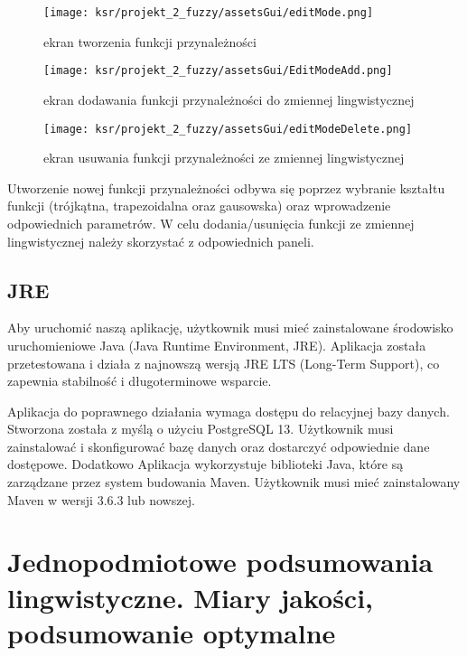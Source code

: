 \documentclass{article}
\begin{document}
\begin{figure}[H]
  \begin{minipage}[b]{0.3\linewidth}
    \centering
    \texttt{[image: ksr/projekt\_2\_fuzzy/assetsGui/editMode.png]}
    \caption{ekran tworzenia funkcji przynależności}
  \end{minipage}
  \hfill
  \begin{minipage}[b]{0.3\linewidth}
    \centering
    \texttt{[image: ksr/projekt\_2\_fuzzy/assetsGui/EditModeAdd.png]}
    \caption{ekran dodawania funkcji przynależności do zmiennej lingwistycznej}
  \end{minipage}
  \hfill
  \begin{minipage}[b]{0.3\linewidth}
    \centering
    \texttt{[image: ksr/projekt\_2\_fuzzy/assetsGui/editModeDelete.png]}
    \caption{ekran usuwania funkcji przynależności ze zmiennej lingwistycznej}
  \end{minipage}
\end{figure}

\noindent Utworzenie nowej funkcji przynależności odbywa się poprzez wybranie kształtu funkcji (trójkątna, trapezoidalna oraz gausowska) oraz wprowadzenie odpowiednich parametrów. W celu dodania/usunięcia funkcji ze zmiennej lingwistycznej należy skorzystać z odpowiednich paneli.


\subsection{JRE}

\noindent Aby uruchomić naszą aplikację, użytkownik musi mieć zainstalowane środowisko uruchomieniowe Java (Java Runtime Environment, JRE). Aplikacja została przetestowana i działa z najnowszą wersją JRE LTS (Long-Term Support), co zapewnia stabilność i długoterminowe wsparcie.

\noindent Aplikacja do poprawnego działania wymaga dostępu do relacyjnej bazy danych. Stworzona została z myślą o użyciu PostgreSQL 13. Użytkownik musi zainstalować i skonfigurować bazę danych oraz dostarczyć odpowiednie dane dostępowe. Dodatkowo Aplikacja wykorzystuje biblioteki Java, które są zarządzane przez system budowania Maven. Użytkownik musi mieć zainstalowany Maven w wersji 3.6.3 lub nowszej.


\section{ Jednopodmiotowe podsumowania lingwistyczne. Miary jakości, podsumowanie optymalne}
\end{document}
